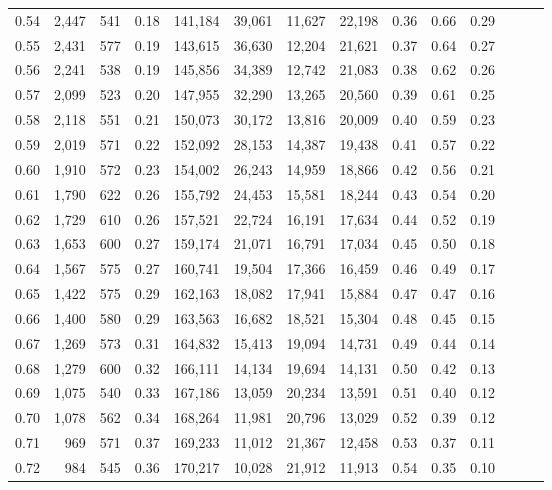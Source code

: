 \begin{tabular}{rrrrrrrrrrrrrr}
0.54 &  2,447 &  541 &  0.18 &  141,184 &   39,061 &  11,627 &  22,198 &  0.36 &  0.66 &      0.29 \\
0.55 &  2,431 &  577 &  0.19 &  143,615 &   36,630 &  12,204 &  21,621 &  0.37 &  0.64 &      0.27 \\
0.56 &  2,241 &  538 &  0.19 &  145,856 &   34,389 &  12,742 &  21,083 &  0.38 &  0.62 &      0.26 \\
0.57 &  2,099 &  523 &  0.20 &  147,955 &   32,290 &  13,265 &  20,560 &  0.39 &  0.61 &      0.25 \\
0.58 &  2,118 &  551 &  0.21 &  150,073 &   30,172 &  13,816 &  20,009 &  0.40 &  0.59 &      0.23 \\
0.59 &  2,019 &  571 &  0.22 &  152,092 &   28,153 &  14,387 &  19,438 &  0.41 &  0.57 &      0.22 \\
0.60 &  1,910 &  572 &  0.23 &  154,002 &   26,243 &  14,959 &  18,866 &  0.42 &  0.56 &      0.21 \\
0.61 &  1,790 &  622 &  0.26 &  155,792 &   24,453 &  15,581 &  18,244 &  0.43 &  0.54 &      0.20 \\
0.62 &  1,729 &  610 &  0.26 &  157,521 &   22,724 &  16,191 &  17,634 &  0.44 &  0.52 &      0.19 \\
0.63 &  1,653 &  600 &  0.27 &  159,174 &   21,071 &  16,791 &  17,034 &  0.45 &  0.50 &      0.18 \\
0.64 &  1,567 &  575 &  0.27 &  160,741 &   19,504 &  17,366 &  16,459 &  0.46 &  0.49 &      0.17 \\
0.65 &  1,422 &  575 &  0.29 &  162,163 &   18,082 &  17,941 &  15,884 &  0.47 &  0.47 &      0.16 \\
0.66 &  1,400 &  580 &  0.29 &  163,563 &   16,682 &  18,521 &  15,304 &  0.48 &  0.45 &      0.15 \\
0.67 &  1,269 &  573 &  0.31 &  164,832 &   15,413 &  19,094 &  14,731 &  0.49 &  0.44 &      0.14 \\
0.68 &  1,279 &  600 &  0.32 &  166,111 &   14,134 &  19,694 &  14,131 &  0.50 &  0.42 &      0.13 \\
0.69 &  1,075 &  540 &  0.33 &  167,186 &   13,059 &  20,234 &  13,591 &  0.51 &  0.40 &      0.12 \\
0.70 &  1,078 &  562 &  0.34 &  168,264 &   11,981 &  20,796 &  13,029 &  0.52 &  0.39 &      0.12 \\
0.71 &    969 &  571 &  0.37 &  169,233 &   11,012 &  21,367 &  12,458 &  0.53 &  0.37 &      0.11 \\
0.72 &    984 &  545 &  0.36 &  170,217 &   10,028 &  21,912 &  11,913 &  0.54 &  0.35 &      0.10 \\

\end{tabular}

